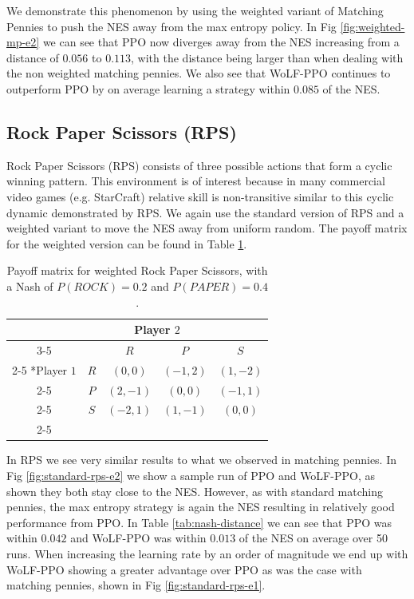 \documentclass[conference]{IEEEtran}
\begin{document}
We demonstrate this phenomenon by using the weighted variant of Matching Pennies to push the NES away from the max entropy policy. In Fig \ref{fig:weighted-mp-e2} we can see that PPO now diverges away from the NES increasing from a distance of $0.056$ to $0.113$, with the distance being larger than when dealing with the non weighted matching pennies. We also see that WoLF-PPO continues to outperform PPO by on average learning a strategy within $0.085$ of the NES.

\subsection{Rock Paper Scissors (RPS)}

Rock Paper Scissors (RPS) consists of three possible actions that form a cyclic winning pattern. This environment is of interest because in many commercial video games (e.g. StarCraft\cite{balduzzi2019open}) relative skill is non-transitive similar to this cyclic dynamic demonstrated by RPS. We again use the standard version of RPS and a weighted variant to move the NES away from uniform random. The payoff matrix for the weighted version can be found in Table \ref{tab:weighted-rps}.

\begin{table}[!ht]
    \centering
    \setlength{\extrarowheight}{2pt}
    \begin{tabular}{*{5}{c|}}
      \multicolumn{2}{c}{} & \multicolumn{2}{c}{Player $2$}\\\cline{3-5}
      \multicolumn{1}{c}{} &  & $R$  & $P$ & $S$ \\\cline{2-5}
      \multirow{2}*{Player $1$}  & $R$ & $(0,0)$ & $(-1,2)$ & $(1,-2)$ \\\cline{2-5}
      & $P$ & $(2,-1)$ & $(0,0)$ & $(-1,1)$ \\\cline{2-5}
      & $S$ & $(-2,1)$ & $(1,-1)$ & $(0,0)$ \\\cline{2-5}
    \end{tabular}
    \caption{Payoff matrix for weighted Rock Paper Scissors, with a Nash of $P(ROCK)=0.2$ and $P(PAPER)=0.4$.}
    \label{tab:weighted-rps}
\end{table}


In RPS we see very similar results to what we observed in matching pennies. In Fig \ref{fig:standard-rps-e2} we show a sample run of PPO and WoLF-PPO, as shown they both stay close to the NES. However, as with standard matching pennies, the max entropy strategy is again the NES resulting in relatively good performance from PPO. In Table \ref{tab:nash-distance} we can see that PPO was within $0.042$ and WoLF-PPO was within $0.013$ of the NES on average over 50 runs. When increasing the learning rate by an order of magnitude we end up with WoLF-PPO showing a greater advantage over PPO as was the case with matching pennies, shown in Fig \ref{fig:standard-rps-e1}.
\end{document}
